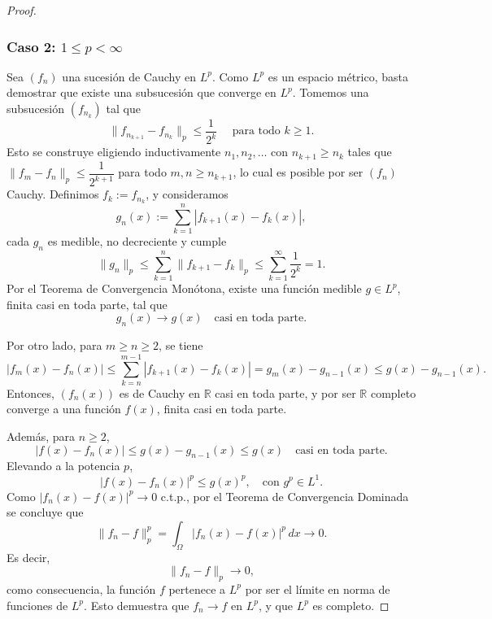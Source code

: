\begin{proof}
\subsubsection*{Caso 2: \( 1 \leq p < \infty \)}

Sea \( (f_n) \) una sucesión de Cauchy en \( L^p \). Como \( L^p \) es un espacio métrico, basta demostrar que existe una subsucesión que converge en \( L^p \). Tomemos una subsucesión \( (f_{n_k}) \) tal que
\[
\|f_{n_{k+1}} - f_{n_k}\|_p \leq \frac{1}{2^k} \quad \text{ para todo } k \geq 1.
\]
Esto se construye eligiendo inductivamente \( n_1, n_2, \dots \)  con \( n_{k+1} \geq n_k \) tales que \( \|f_m - f_n\|_p \leq \dfrac{1}{2^{k+1}} \) para todo \( m, n \geq n_{k+1} \), lo cual es posible por ser \( (f_n) \) Cauchy. Definimos \( f_k := f_{n_k} \), y consideramos
\[
g_n(x) := \sum_{k=1}^n |f_{k+1}(x) - f_k(x)|,
\]
cada \( g_n \) es medible, no decreciente y cumple
\[
\|g_n\|_p \leq \sum_{k=1}^n \|f_{k+1} - f_k\|_p \leq \sum_{k=1}^\infty \frac{1}{2^k} = 1.
\]
Por el Teorema de Convergencia Monótona, existe una función medible \( g \in L^p \), finita casi en toda parte, tal que
\[
g_n(x) \to g(x) \quad \text{casi en toda parte}.
\]

Por otro lado, para \( m \geq n \geq 2 \), se tiene
\[
|f_m(x) - f_n(x)| \leq \sum_{k=n}^{m-1} |f_{k+1}(x) - f_k(x)| = g_m(x) - g_{n-1}(x) \leq g(x) - g_{n-1}(x).
\]
Entonces, \( (f_n(x)) \) es de Cauchy en \( \mathbb{R} \) casi en toda parte, y por ser \( \mathbb{R} \) completo converge a una función \( f(x) \), finita casi en toda parte.

Además, para \( n \geq 2 \),
\[
|f(x) - f_n(x)| \leq g(x) - g_{n-1}(x)\leq g(x) \quad \text{casi en toda parte}.
\]
Elevando a la potencia \( p \),
\[
|f(x) - f_n(x)|^p \leq g(x)^p, \quad \text{con } g^p \in L^1.
\]
Como \( |f_n(x) - f(x)|^p \to 0 \) c.t.p., por el Teorema de Convergencia Dominada se concluye que
\[
\|f_n - f\|_p^p = \int_\Omega |f_n(x) - f(x)|^p \, dx \to 0.
\]
Es decir,
\[
\|f_n - f\|_p \to 0,
\]
como consecuencia, la función \( f \) pertenece a \( L^p \) por ser el límite en norma de funciones de \( L^p \). Esto demuestra que \( f_n \to f \) en \( L^p \), y que \( L^p \) es completo.





\end{proof}
